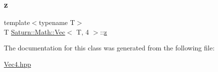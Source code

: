 \mbox{\label{class_saturn_1_1_math_1_1_vec_3_01_t_00_014_01_4_afd100e7563d2cdc6a2a52d439302e0e0}} 
\subsubsection{\texorpdfstring{z}{z}}
{\footnotesize\ttfamily template$<$typename T$>$ \\
T \mbox{\hyperlink{class_saturn_1_1_math_1_1_vec}{Saturn\+::\+Math\+::\+Vec}}$<$ T, 4 $>$\+::\mbox{\hyperlink{glad_8h_a1c599441d9dece861ee2cd70e31ce120}{z}}}



The documentation for this class was generated from the following file\+:\begin{DoxyCompactItemize}
\item 
\mbox{\hyperlink{_vec4_8hpp}{Vec4.\+hpp}}\end{DoxyCompactItemize}
